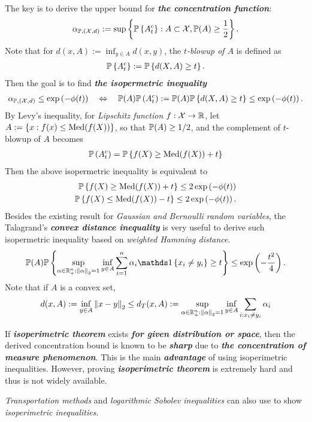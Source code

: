 \documentclass[11pt]{article}
\begin{document}
\begin{enumerate}
The key is to derive the upper bound for \emph{\textbf{the concentration function}}: 
\begin{align*}
\alpha_{{\mathbb P}, ({\mathcal X}, d)} := \sup\left\{ {\mathbb P}\left\{A_t^c\right\}:  A \subset {\mathcal X}, {\mathbb P}(A) \ge \frac{1}{2}  \right\}.
\end{align*} Note that for $d(x, A) := \inf_{y\in A}d(x, y)$,  the \emph{$t$-blowup of $A$} is defined as  
\begin{align*}
{\mathbb P}\left\{A_t^c\right\} := {\mathbb P}\left\{d(X, A) \ge t\right\}.
\end{align*} Then the goal is to find \emph{\textbf{the  isopermetric inequality}}
\begin{align*}
\alpha_{{\mathbb P}, ({\mathcal X}, d)} \le \exp\left(- \phi(t)\right) \quad \Leftrightarrow  \quad {\mathbb P}(A){\mathbb P}\left(A_t^c\right) := {\mathbb P}(A){\mathbb P}\left\{d(X, A) \ge t\right\} \le \exp\left(- \phi(t)\right).
\end{align*} By Levy's inequality,  for \emph{Lipschitz function} $f: {\mathcal X} \to {\mathbb R}$,   let $A:=\left\{x: f(x) \le \text{Med}(f(X))\right\}$, so that ${\mathbb P}(A) \ge 1/2$, and the complement of $t$-blowup of $A$ becomes
\begin{align*}
{\mathbb P}\left(A_t^c\right)  = {\mathbb P}\left\{f(X) \ge \text{Med}(f(X)) + t\right\}
\end{align*} Then the above isopermetric inequality is equivalent to 
\begin{align*}
 {\mathbb P}\left\{f(X) \ge \text{Med}(f(X)) + t\right\} \le 2\exp\left(- \phi(t)\right)\\
  {\mathbb P}\left\{f(X) \le \text{Med}(f(X)) - t\right\} \le 2\exp\left(- \phi(t)\right).
\end{align*}
Besides the existing result for \emph{Gaussian and Bernoulli random variables}, the Talagrand's \emph{\textbf{convex distance inequality}} is very useful to derive such isopermetric inequality based on \emph{weighted Hamming distance}.
\begin{align*}
\bP(A)\bP\set{\sup_{\alpha \in \bR_{+}^{n}: \norm{\alpha}{2} = 1}\inf_{y\in A} \sum_{i=1}^{n}\alpha_i\ind{x_i \neq y_i} \ge t} \le  \exp\paren{-\frac{t^2}{4}}. \nonumber
\end{align*} Note that if $A$ is a convex set,
\begin{align*}
d(x, A):= \inf_{y \in A}\left\|x - y\right\|_{2} \le d_{T}(x, A) := \sup_{\alpha \in {\mathbb R}_{+}^{n}: \left\|\alpha\right\|_{2} = 1}\inf_{y\in A} \sum_{i: x_i \neq y_i}\alpha_i
\end{align*}

If \emph{\textbf{isoperimetric theorem}} exists \emph{\textbf{for given distribution or space}}, then the derived concentration bound is known to be \emph{\textbf{sharp}} due to \emph{\textbf{the concentration of measure phenomenon}}. This is the main \emph{\textbf{advantage}} of using isoperimetric inequalities. However, proving \emph{\textbf{isoperimetric theorem}} is extremely hard and thus is not widely available. 

\emph{Transportation methods} and \emph{logarithmic Sobolev inequalities} can also use to show \emph{isoperimetric inequalities}.

\end{enumerate}
\end{document}
